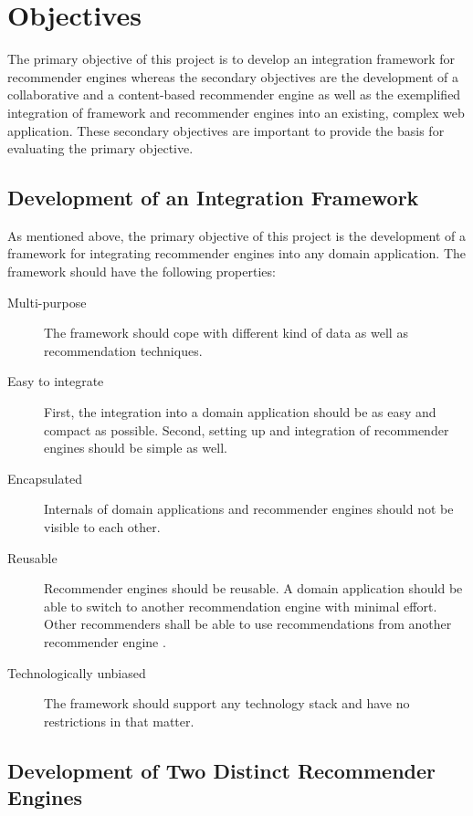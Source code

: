 \section{Objectives}
\label{intro-objectives}

The primary objective of this project is to develop an integration framework for recommender engines whereas the secondary objectives are the development of a collaborative and a content-based recommender engine as well as the exemplified integration of framework and recommender engines into an existing, complex web application. These secondary objectives are important to provide the basis for evaluating the primary objective.

\subsection{Development of an Integration Framework}
\label{intro-objectives-framework}

As mentioned above, the primary objective of this project is the development of a framework for integrating recommender engines into any domain application. The framework should have the following properties:

\begin{description}
    \item[Multi-purpose] The framework should cope with different kind of data as well as recommendation techniques.
    \item[Easy to integrate] First, the integration into a domain application should be as easy and compact as possible. Second, setting up and integration of recommender engines should be simple as well.
    \item[Encapsulated] Internals of domain applications and recommender engines should not be visible to each other.
    \item[Reusable] Recommender engines should be reusable. A domain application should be able to switch to another recommendation engine with minimal effort. Other recommenders shall be able to use recommendations from another recommender engine \cite{manouselis07}.
    \item[Technologically unbiased] The framework should support any technology stack and have no restrictions in that matter.
\end{description}

\subsection{Development of Two Distinct Recommender Engines}
\label{intro-objectives-engines}

